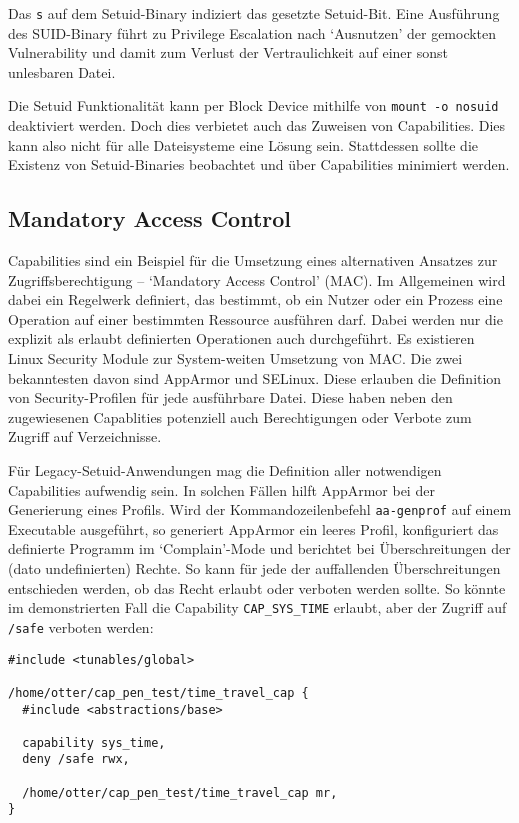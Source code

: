 Das \texttt{s} auf dem Setuid-Binary indiziert das gesetzte Setuid-Bit. Eine Ausführung des SUID-Binary führt zu Privilege Escalation nach `Ausnutzen' der gemockten Vulnerability und damit zum Verlust der Vertraulichkeit auf einer sonst unlesbaren Datei.

Die Setuid Funktionalität kann per Block Device mithilfe von \texttt{mount -o nosuid} deaktiviert werden. Doch dies verbietet auch das Zuweisen von Capabilities. Dies kann also nicht für alle Dateisysteme eine Lösung sein. Stattdessen sollte
die Existenz von Setuid-Binaries beobachtet und über Capabilities minimiert werden.

\subsection{Mandatory Access Control}

Capabilities sind ein Beispiel für die Umsetzung eines alternativen Ansatzes zur Zugriffsberechtigung -- `Mandatory Access Control' (MAC). Im Allgemeinen wird dabei ein Regelwerk definiert, das bestimmt, ob ein Nutzer oder ein Prozess eine Operation auf einer bestimmten Ressource ausführen darf. Dabei werden nur die explizit als erlaubt definierten Operationen auch durchgeführt. Es existieren Linux Security Module zur System-weiten Umsetzung von MAC. Die zwei bekanntesten davon
sind AppArmor und SELinux. Diese erlauben die Definition von Security-Profilen für jede ausführbare Datei. Diese haben neben den zugewiesenen Capablities potenziell auch Berechtigungen oder Verbote zum Zugriff auf Verzeichnisse.

Für Legacy-Setuid-Anwendungen mag die Definition aller notwendigen Capabilities aufwendig sein. In solchen Fällen hilft AppArmor bei der Generierung eines Profils. Wird der Kommandozeilenbefehl \texttt{aa-genprof} auf einem Executable ausgeführt, so generiert
AppArmor ein leeres Profil, konfiguriert das definierte Programm im `Complain'-Mode und berichtet bei Überschreitungen der (dato undefinierten) Rechte. So kann für jede der auffallenden Überschreitungen entschieden werden, ob das Recht erlaubt oder verboten werden sollte. So könnte im demonstrierten Fall die Capability \texttt{CAP\_SYS\_TIME} erlaubt, aber der Zugriff auf \texttt{/safe} verboten werden:

\begin{lstlisting}
#include <tunables/global>

/home/otter/cap_pen_test/time_travel_cap {
  #include <abstractions/base>

  capability sys_time,
  deny /safe rwx,

  /home/otter/cap_pen_test/time_travel_cap mr,
}
\end{lstlisting}



